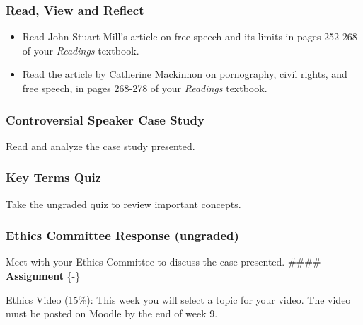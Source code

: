 \documentclass[
]{book}
\providecommand{\tightlist}{%
  \setlength{\itemsep}{0pt}\setlength{\parskip}{0pt}}
\begin{document}
\begin{reflect}
\hypertarget{read-view-and-reflect-14}{%
\subsubsection*{Read, View and Reflect}\label{read-view-and-reflect-14}}

\begin{itemize}
\tightlist
\item
  Read John Stuart Mill's article on free speech and its limits in pages 252-268 of your \emph{Readings} textbook.\\
\item
  Read the article by Catherine Mackinnon on pornography, civil rights, and free speech, in pages 268-278 of your \emph{Readings} textbook.
\end{itemize}

\hypertarget{controversial-speaker-case-study}{%
\subsubsection*{Controversial Speaker Case Study}\label{controversial-speaker-case-study}}

Read and analyze the case study presented.

\hypertarget{key-terms-quiz-3}{%
\subsubsection*{Key Terms Quiz}\label{key-terms-quiz-3}}

Take the ungraded quiz to review important concepts.

\hypertarget{ethics-committee-response-ungraded-1}{%
\subsubsection*{Ethics Committee Response (ungraded)}\label{ethics-committee-response-ungraded-1}}

Meet with your Ethics Committee to discuss the case presented.
\#\#\#\# \textbf{Assignment} \{-\}

Ethics Video (15\%): This week you will select a topic for your video. The video must be posted on Moodle by the end of week 9.
\end{reflect}
\end{document}
